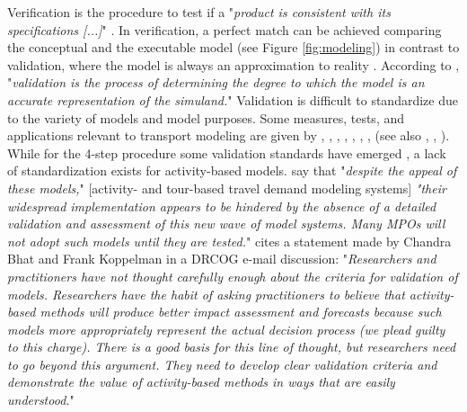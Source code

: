 Verification is the procedure to test if a "\emph{product is consistent with its specifications [...]}" \citet[][p.330]{Petty_SokolowskiBanks_2010}. In verification, a perfect match can be achieved comparing the conceptual and the executable model (see Figure \ref{fig:modeling}) in contrast to validation, where the model is always an approximation to reality \citep[][p.145]{Kleijnen_EJOR_1995}. According to \citet[][p.331]{Petty_SokolowskiBanks_2010}, "\emph{validation is the process of determining the degree to which the model is an accurate representation of the simuland.}" Validation is difficult to standardize due to the variety of models and model purposes. Some measures, tests, and applications relevant to transport modeling are given by \citet[][Table 2]{MilamChao_TRBATPM_2001}, \citet[][]{Lima_TechRep_LMPO_2006}, \citet[][p.155]{KurthEtAl_TRBTDF_2006}, \citet[][p.157]{PendyalaBhat_TRBTDF_2006}, \citet[][p.8]{WegmannEverett_TechRep_CTRUT_2008}, \citet[][]{MilamChao_TRBATPM_2001, RoordaEtAl_TransResA_2008, HawasHameed_TPT_2009, SadekEtAl_TRR_2003, GouliasKitamura_TRR_1992}, \citet[][p.25]{CambridgeSystematics_manual_2008}, \citet[][p.145]{Kleijnen_EJOR_1995} (see also \citet[][]{David_EACSSS_2009}, \citet[][p.56]{SbaytiRoden_ResRep_AASHTO_2010}, \citet[][]{SchifferRossi_TRB_2009}). While for the 4-step procedure some validation standards have emerged \citep[e.g.,][]{BartonAschmanCambridgeSystematics_manual_1997}, a lack of standardization exists for activity-based models. \citet[][]{PendyalaBhat_TRBTDF_2006} say that "\emph{despite the appeal of these models,}" [activity- and tour-based travel demand modeling systems] \emph{"their widespread implementation appears to be hindered by the absence of a detailed validation and assessment of this new wave of model systems. Many MPOs will not adopt such models until they are tested.}" \citet[][]{KurthEtAl_TRBTDF_2006} cites a statement made by Chandra Bhat and Frank Koppelman in a DRCOG e-mail discussion: "\emph{Researchers and practitioners have not thought carefully enough about the criteria for validation of models. Researchers have the habit of asking practitioners to believe that activity- based methods will produce better impact assessment and forecasts because such models more appropriately represent the actual decision process (we plead guilty to this charge). There is a good basis for this line of thought, but researchers need to go beyond this argument. They need to develop clear validation criteria and demonstrate the value of activity-based methods in ways that are easily understood.}"

